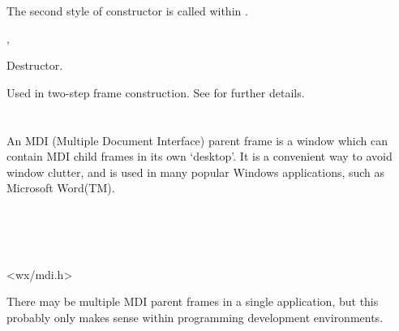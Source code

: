 



The second style of constructor is called within .


,\rtfsp
{}



Destructor.

\label{wxmdiclientwindowcreateclient}


Used in two-step frame construction. See \rtfsp
for further details.

\section{}\label{wxmdiparentframe}

An MDI (Multiple Document Interface) parent frame is a window which can contain
MDI child frames in its own `desktop'. It is a convenient way to avoid window clutter,
and is used in many popular Windows applications, such as Microsoft Word(TM).


\\
\\
\\


<wx/mdi.h>


There may be multiple MDI parent frames in a single application, but this probably only makes sense
within programming development environments.

